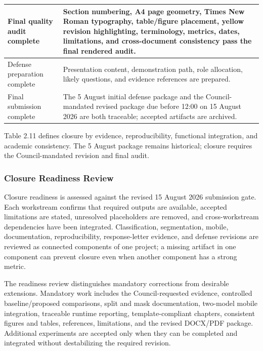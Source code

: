 \documentclass[12pt,a4paper]{report}
\newenvironment{revisionblock}{\begin{snugshade}\noindent}{\end{snugshade}}
\begin{document}
\begin{longtable}{|>{\centering\arraybackslash}p{4.40cm}|>{\centering\arraybackslash}p{11.40cm}|}
\rowcolor{RevisionYellow}Final quality audit complete & Section numbering, A4 page geometry, Times New Roman typography, table/figure placement, yellow revision highlighting, terminology, metrics, dates, limitations, and cross-document consistency pass the final rendered audit. \\ \hline
Defense preparation complete & Presentation content, demonstration path, role allocation, likely questions, and evidence references are prepared. \\ \hline
\rowcolor{RevisionYellow}Final submission complete & The 5 August initial defense package and the Council-mandated revised package due before 12:00 on 15 August 2026 are both traceable; accepted artifacts are archived. \\ \hline
\end{longtable}
\endgroup
\begin{revisionblock}
Table 2.11 defines closure by evidence, reproducibility, functional integration, and academic consistency. The 5 August package remains historical; closure requires the Council-mandated revision and final audit.
\end{revisionblock}
\subsubsection{\texorpdfstring{\colorbox{RevisionYellow}{Closure Readiness Review}}{Closure Readiness Review}}
\begin{revisionblock}
Closure readiness is assessed against the revised 15 August 2026 submission gate. Each workstream confirms that required outputs are available, accepted limitations are stated, unresolved placeholders are removed, and cross-workstream dependencies have been integrated. Classification, segmentation, mobile, documentation, reproducibility, response-letter evidence, and defense revisions are reviewed as connected components of one project; a missing artifact in one component can prevent closure even when another component has a strong metric.
\end{revisionblock}
\begin{revisionblock}
The readiness review distinguishes mandatory corrections from desirable extensions. Mandatory work includes the Council-requested evidence, controlled baseline/proposed comparisons, split and mask documentation, two-model mobile integration, traceable runtime reporting, template-compliant chapters, consistent figures and tables, references, limitations, and the revised DOCX/PDF package. Additional experiments are accepted only when they can be completed and integrated without destabilizing the required revision.
\end{revisionblock}
\end{document}
